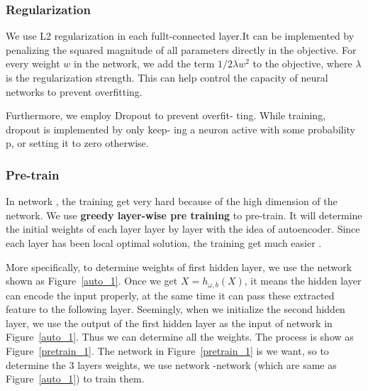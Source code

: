 \documentclass[sigconf]{acmart}
\begin{document}
\subsubsection{Regularization}
We use L2 regularization in each fullt-connected layer.It can be implemented by penalizing the squared magnitude of all parameters directly in the objective. For every weight $w$ in the network, we add the term $1/2\lambda w^2$ to the objective, where $\lambda$ is the regularization strength. This can help control the capacity of neural networks to prevent overfitting.

Furthermore, we employ Dropout \cite{Dropout} to prevent overfit- ting. While training, dropout is implemented by only keep- ing a neuron active with some probability p, or setting it to zero otherwise.

\subsubsection{Pre-train}
In network , the training get very hard because of the high dimension of the network. We use \textbf{greedy layer-wise pre training} to pre-train. It will determine the initial weights of each layer layer by layer with the idea of autoencoder. Since each layer has been local optimal solution, the training get much easier .

More specifically, to determine weights of first hidden layer, we use the network shown as Figure~\ref{auto_1}. Once we get $X=h_{\omega,b}(X)$, it means the hidden layer can encode the input properly, at the same time it can pass these extracted feature to the following layer. Seemingly, when we initialize the second hidden layer, we use the output of the first hidden layer as the input of network in Figure~\ref{auto_1}. Thus we can determine all the weights. The process is show as Figure~\ref{pretrain_1}. The network   in  Figure~\ref{pretrain_1} is we want, so to determine the 3 layers weights, we use network -network  (which are same as  Figure~\ref{auto_1}) to train them.
\end{document}
